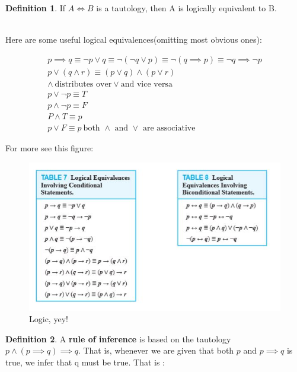 \documentclass{article}
\theoremstyle{definition}
\newtheorem{definition}{Definition}
\numberwithin{equation}{subsection}
\numberwithin{remark}{subsection}
\begin{document}
\begin{definition}
If $A \iff B$ is a tautology, then A is logically equivalent to B. 
\end{definition}
\\

Here are some useful logical equivalences(omitting most obvious ones):

\begin{align*}
    p \implies q \equiv \neg p \lor q \equiv \neg(\neg q \lor p) \equiv \neg(q \implies p) \equiv \neg q \implies \neg p \\
    p \lor ( q \land r) \equiv (p \lor q) \land (p \lor r) \\
    \land \ \text{distributes over} \lor \text{and vice versa}\\
    p \lor \neg p \equiv T\\
    p \land \neg p \equiv F\\
    P \land T \equiv p\\
    p \lor F \equiv p
    \ \text{both $\land$ and $\lor$ are associative}
\end{align*}

For more see this figure:

\begin{figure}[h]
    \centering
    \includegraphics[scale = 0.7]{epflSemesterOne/advancedComputation/figures/logic.JPG}
    \caption{Logic, yey!}
    \label{fig:my_label}
\end{figure}

\begin{definition}
A \textbf{rule of inference} is based on the tautology $p \land (p \implies q) \implies q$. That is, whenever we are given that both $p$ and $p \implies q$ is true, we infer that q must be true. That is :
\\

\end{definition}
\end{document}
